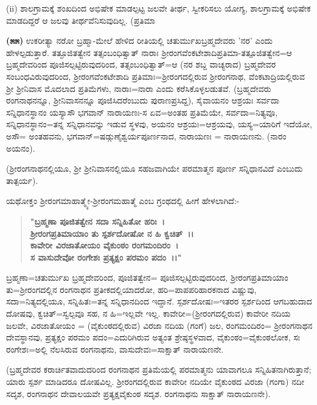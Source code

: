 (ii) ಶಾಲಗ್ರಾಮಕ್ಕೆ ಶಂಖದಿಂದ ಅಭಿಷೇಕ ಮಾಡಲ್ಪಟ್ಟ ಜಲವೇ ತೀರ್ಥ, ಸ್ವೀಕರಿಸಲು ಯೋಗ್ಯ, ಶಾಲಗ್ರಾಮಕ್ಕೆ ಅಭಿಷೇಕ ಮಾಡದಿದ್ದರೆ ಆ ಜಲವು ತೀರ್ಥವೆನಿಸುವುದಿಲ್ಲ. (ಪ್ರತಿಮಾ\-

\textbf{(೫೫)} ಉಕರೀತ್ಯಾ ನರೋ ಬ್ರಹ್ಮಾ-ಮೇಲೆ ಹೇಳಿದ ರೀತಿಯಲ್ಲಿ ಚತುರ್ಮುಖಬ್ರಹ್ಮದೇವರು 'ನರ' ಎಂದು ಹೇಳಲ್ಪಡುತ್ತಾರೆ. ತತ್ಫೂಜಿತತ್ವೇನ ತತ್ಸಂಬಂಧಿತ್ವಾತ್ ನಾರಾಃ ಶ‍್ರೀರಂಗವೆಂಕಟೇಶಾದಿಪ್ರತಿಮಾ-ತತ್ಪೂಜಿತತ್ವೇನ=ಆ ಬ್ರಹ್ಮದೇವರಿಂದ ಪೂಜಿಸಲ್ಪಟ್ಟಿರುವುದರಿಂದ, ತತ್ಸಂಬಂಧಿತ್ವಾತ್=ಆ (ನರ ಶಬ್ದ ವಾಚ್ಯರಾದ) ಬ್ರಹ್ಮದೇವರ ಸಂಬಂಧವಿರುವುದರಿಂದ, ಶ‍್ರೀರಂಗವೆಂಕಟೇಶಾದಿ ಪ್ರತಿಮಾಃ=ಶ‍್ರೀರಂಗದಲ್ಲಿರುವ ಶ‍್ರೀರಂಗನಾಥ, ವೆಂಕಟಾದ್ರಿಯಲ್ಲಿರುವ ಶ‍್ರೀ ಶ‍್ರೀನಿವಾಸ ಮೊದಲಾದ ಪ್ರತಿಮೆಗಳು, ನಾರಾಃ=ನಾರಾ ಎಂದು ಕರೆಸಿಕೊಳ್ಳಲಡುತವೆ. (ಬ್ರಹ್ಮದೇವರು ರಂಗನಾಥನನ್ನೂ, ಶ‍್ರೀನಿವಾಸನನ್ನೂ ಪೂಜಿಸಿದರೆಂಬುದು ಪುರಾಣಪ್ರಸಿದ್ದ), ಸೈವಾಯನಂ ಆಶ್ರಯಃ ಸರ್ವದಾ ಸನ್ನಿಧಾನಸ್ಥಾನಂ ಯಸ್ಯಾಸೌ ಭಗವಾನ್ ನಾರಾಯಣಃ-ಸ ಏವ=ಅಂತಹ ಪ್ರತಿಮೆಯೇ, ಸರ್ವದಾ=ನಿತ್ಯವೂ, ಸನ್ನಿಧಾನ\-ಸ್ಥಾನಂ=ತನ್ನ ಸನ್ನಿಧಾನವನ್ನು ಇಡುವ ಸ್ಥಳವು, ಅಯನಂ ಆಶ್ರಯಃ=ಆಶ್ರಯವು, ಯಸ್ಯ=\break ಯಾರಿಗೆ ಇದೆಯೋ, ಅಸೌ= ಅಂತಹವನು, ಭಗವಾನ್=ಷಡ್ಗುಣೈಶ್ವರ್ಯಪೂರ್ಣನಾದ, ನಾರಾಯಣಃ = ನಾರಾಯಣನು. (ನಾರಂ ಅಯನಂ).

(ಶ‍್ರೀರಂಗನಾಥನಲ್ಲಿಯೂ, ಶ‍್ರೀ ಶ‍್ರೀನಿವಾಸನಲ್ಲಿಯೂ ಸಹಜವಾಗಿಯೇ ಪರಮಾತ್ಮನ ಪೂರ್ಣ ಸನ್ನಿಧಾನವಿದೆ ಎಂಬುದು ತಾತ್ಪರ್ಯ).

ಯಥೋಕ್ತಂ ಶ‍್ರೀರಂಗಮಾಹಾತ್ಮ್ಯೇ-ಶ‍್ರೀರಂಗಮಹಾತ್ಮೆ ಎಂಬ ಗ್ರಂಥದಲ್ಲಿ ಹೀಗೆ ಹೇಳಲಾಗಿದೆ:-

\begin{verse}
\textbf{"ಬ್ರಹ್ಮಣಾ ಪೂಜಿತತ್ವೇನ ಸದಾ ಸನ್ನಿಹಿತೋ ಹರಿಃ~।}\\\textbf{ಶ‍್ರೀರಂಗಪ್ರತಿಮಾಯಾಂ ತು ಸ್ಪರ್ಶದೋಷೋ ನ ಹಿ ಕ್ವಚಿತ್~।।}\\\textbf{ಕಾವೇರೀ ವಿರಜಾತೋಯಂ ವೈಕುಂಠಂ ರಂಗಮಂದಿರಂ~।}\\\textbf{ಸ ವಾಸುದೇವೋ ರಂಗೇಶಃ ಪ್ರತ್ಯಕ್ಷಂ ಪರಮಂ ಪದಂ~।।"}
\end{verse}


ಬ್ರಹ್ಮಣಾ=ಚತುರ್ಮುಖ ಬ್ರಹ್ಮದೇವರಿಂದ, ಪೂಜಿತತ್ವೇನ= ಪೂಜಿಸಲ್ಪಟ್ಟಿರುವುದರಿಂದ, ಶ‍್ರೀರಂಗಪ್ರತಿಮಾಯಾಂ ತು=ಶ‍್ರೀರಂಗದಲ್ಲಿನ ರಂಗನಾಥನ ಪ್ರತೀಕದಲ್ಲಿಯಾದರೋ, ಹರಿ=ಪಾಪಪರಿಹಾರಕನಾದ ವಿಷ್ಣುವು, ಸದಾ=ನಿತ್ಯದಲ್ಲಿಯೂ, ಸನ್ನಿಹಿತಃ=ತನ್ನ ಸನ್ನಿಧಾನದಿಂದ ಇದ್ದಾನೆ. ಸ್ಪರ್ಶದೋಷಃ=ಇತರರ ಸ್ಪರ್ಶದಿಂದ ಆಗಬಹುದಾದ ದೋಷವು, ಕ್ವಚಿತ್=\-ಸ್ವಲ್ಪವೂ ಸಹ, ನ ಹಿ=ಇಲ್ಲವೇ ಇಲ್ಲ. ಕಾವೇರೀ=(ಶ‍್ರೀರಂಗದಲ್ಲಿರುವ) ಕಾವೇರೀ ನದಿಯ ಜಲವೇ, ವಿರಜಾತೋಯಂ = (ವೈಕುಂಠದಲ್ಲಿರುವ) ವಿರಜಾ ನದಿಯ (ಗಂಗೆ) ಜಲ, ರಂಗಮಂದಿರಂ= ಶ‍್ರೀರಂಗನಾಥನ ದೇವಸ್ಥಾನವು, ಪ್ರತ್ಯಕ್ಷಂ ಪರಮಂ ಪದಂ=ಎದುರಿಗಿರುವ ಅತ್ಯಂತ ಶ್ರೇಷ್ಠಸ್ಥಳವಾದ, ವೈಕುಂಠಂ=ವೈಕುಂಠಲೋಕ, ಸಃ ರಂಗೇಶಃ=ಅಲ್ಲಿ ನೆಲಸಿರುವ ರಂಗನಾಥನು, ವಾಸುದೇವಃ=ಸಾಕ್ಷಾತ್ ನಾರಾಯಣನೇ.

(ಬ್ರಹ್ಮದೇವರ ಕರಾರ್ಚಿತವಾದುದರಿಂದ ರಂಗನಾಥನ ಪ್ರತಿಮೆಯಲ್ಲಿ ಪರಮಾತ್ಮನು ಯಾವಾಗಲೂ ಸನ್ನಿಹಿತನಾಗಿರುತ್ತಾನೆ; ಯಾರು ಸ್ಪರ್ಶ ಮಾಡಿದರೂ ದೋಷವಿಲ್ಲ. ಶ‍್ರೀರಂಗ\-ದಲ್ಲಿರುವ ಕಾವೇರೀ ನದಿಯೇ ವೈಕುಂಠದ ವಿರಜಾ (ಗಂಗಾ) ನದೀ ಸದೃಶ, ರಂಗನಾಥನ ದೇವಾಲಯವೇ ಪ್ರತ್ಯಕ್ಷವೈಕುಂಠ ಸದೃಶ. ರಂಗನಾಥನು ಸಾಕ್ಷಾತ್ ನಾರಾಯಣನೇ).

